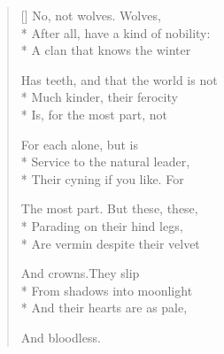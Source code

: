 \label{ch:lear_au}
\settowidth{\versewidth}{Has teeth, and that the world is not}
\begin{verse}[\versewidth]
 No, not wolves.   Wolves,\\*
After all, have a kind of nobility:\\*
A clan that knows the winter

Has teeth, and that the world is not\\*
Much kinder, their ferocity\\*
Is, for the most part, not

For each alone, but is\\*
Service to the natural leader,\\*
Their cyning if you like. For

The most part.  But these, these,\\*
Parading on their hind legs,\\*
Are vermin despite their velvet

And crowns.\qquad They slip\\*
From shadows into moonlight\\*
And their hearts are as pale,

And bloodless.
\end{verse}
